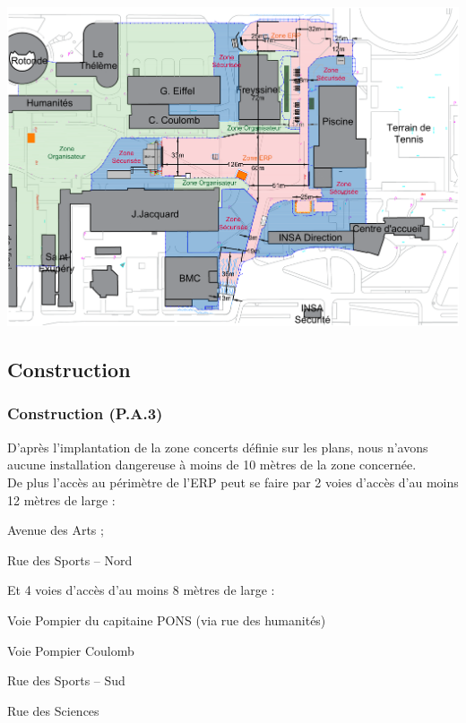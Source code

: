 \documentclass[hidelinks, paper=a4, fontsize=13pt]{report}
\begin{document}
\begin{center}
	\includegraphics[angle=90,width=.8\textwidth,keepaspectratio]{Exports/Plan_24h_44eme-Cotes}
\end{center}
\newpage
\subsection{Construction}

\subsubsection{Construction (P.A.3)} 
\label{refArticleERPContruction}
D’après l’implantation de la zone concerts définie sur les plans, nous n’avons aucune installation dangereuse à moins de 10 mètres de la zone concernée. \\
De plus l’accès au périmètre de l’ERP peut se faire par 2 voies d’accès d’au moins 12 mètres de large : 
\begin{list}{•}{}
	\item Avenue des Arts ;
	\item Rue des Sports – Nord
\end{list}

Et 4 voies d’accès d’au moins 8 mètres de large : 
\begin{list}{•}{}
	\item Voie Pompier du capitaine PONS (via rue des humanités)
	\item Voie Pompier Coulomb
	\item Rue des Sports – Sud
	\item Rue des Sciences
\end{list}
\end{document}
